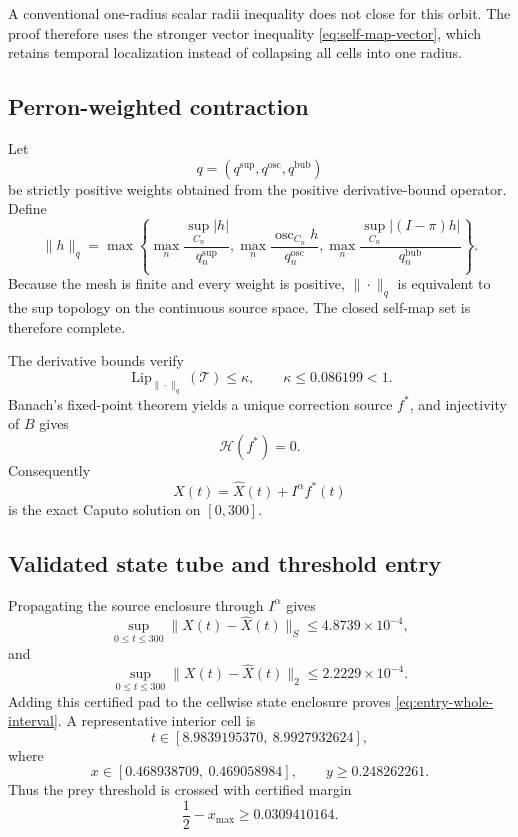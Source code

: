 A conventional one-radius scalar radii inequality does not close for this orbit. The proof therefore uses the stronger vector inequality \eqref{eq:self-map-vector}, which retains temporal localization instead of collapsing all cells into one radius.

\subsection{Perron-weighted contraction}

Let
\[
  q=(q^{\mathrm{sup}},q^{\mathrm{osc}},q^{\mathrm{bub}})
\]
be strictly positive weights obtained from the positive derivative-bound operator. Define
\[
  \|h\|_q
  =
  \max\left\{
  \max_n\frac{\sup_{C_n}|h|}{q_n^{\mathrm{sup}}},
  \max_n\frac{\operatorname{osc}_{C_n}h}{q_n^{\mathrm{osc}}},
  \max_n\frac{\sup_{C_n}|(I-\pi)h|}{q_n^{\mathrm{bub}}}
  \right\}.
\]
Because the mesh is finite and every weight is positive, \(\|\cdot\|_q\) is equivalent to the sup topology on the continuous source space. The closed self-map set is therefore complete.

The derivative bounds verify
\begin{equation}
  \operatorname{Lip}_{\|\cdot\|_q}
  (\mathcal T)
  \le
  \kappa,
  \qquad
  \kappa\le0.086199<1.
  \label{eq:Perron-contraction}
\end{equation}
Banach's fixed-point theorem yields a unique correction source \(f^*\), and injectivity of \(B\) gives
\[
  \mathcal H(f^*)=0.
\]
Consequently
\[
  X(t)=\widehat X(t)+I^\alpha f^*(t)
\]
is the exact Caputo solution on \([0,300]\).

\subsection{Validated state tube and threshold entry}

Propagating the source enclosure through \(I^\alpha\) gives
\[
  \sup_{0\le t\le300}
  \|X(t)-\widehat X(t)\|_S
  \le
  4.8739\times10^{-4},
\]
and
\begin{equation}
  \sup_{0\le t\le300}
  \|X(t)-\widehat X(t)\|_2
  \le
  2.2229\times10^{-4}.
  \label{eq:physical-tube}
\end{equation}
Adding this certified pad to the cellwise state enclosure proves \eqref{eq:entry-whole-interval}. A representative interior cell is
\[
  t\in[8.9839195370,\ 8.9927932624],
\]
where
\[
  x\in[0.468938709,\ 0.469058984],
  \qquad
  y\ge0.248262261.
\]
Thus the prey threshold is crossed with certified margin
\[
  \frac12-x_{\max}
  \ge
  0.0309410164.
\]

